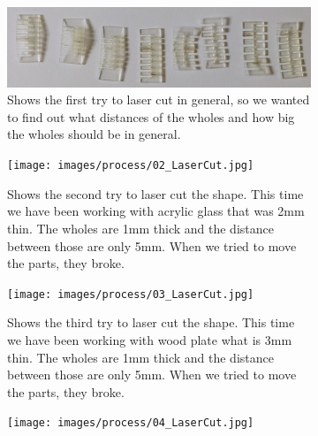 \documentclass[doc.tex]{subfiles}
\begin{document}
    \begin{figure}[H]
        \centering
        \begin{subfigure}{.45\textwidth}
        \centering
        \includegraphics[width=0.8\linewidth]{images/process/01_LaserCut.jpg}
        \caption{Shows the first try to laser cut in general, so we wanted to
                find out what distances of the wholes and how big the wholes 
                should be in general.}
        \label{fig:01_LaserCut}
        \vspace{6mm}
        \end{subfigure}
        \medskip
        \hspace{1mm}
        \begin{subfigure}{.45\textwidth}
            \centering
            \texttt{[image: images/process/02\_LaserCut.jpg]}
            \caption{Shows the second try to laser cut the shape. This time we have been
                    working with acrylic glass that was 2mm thin. The wholes are 1mm thick 
                    and the distance between those are only 5mm. When we tried to move
                    the parts, they broke.}
            \label{fig:02_LaserCut}
            \vspace{6mm}
        \end{subfigure}
        \hspace{1mm}
        \begin{subfigure}{.45\textwidth}
            \centering
            \texttt{[image: images/process/03\_LaserCut.jpg]}
            \caption{Shows the third try to laser cut the shape. This time we have been
                    working with wood plate what is 3mm thin. The wholes are 1mm thick 
                    and the distance between those are only 5mm. When we tried to move
                    the parts, they broke.}
            \label{fig:03_LaserCut}
            \vspace{6mm}
        \end{subfigure}
        \hspace{1mm}
        \begin{subfigure}{.45\textwidth}
            \centering
            \texttt{[image: images/process/04\_LaserCut.jpg]}

\end{subfigure}
\end{figure}
\end{document}
